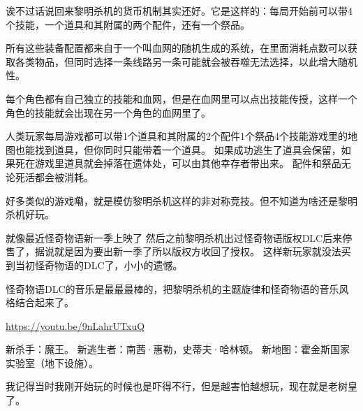 诶不过话说回来黎明杀机的货币机制其实还好。它是这样的：每局开始前可以带4个技能，一个道具和其附属的两个配件，还有一个祭品。

所有这些装备配置都来自于一个叫血网的随机生成的系统，在里面消耗点数可以获取各类物品，但同时选择一条线路另一条可能就会被吞噬无法选择，以此增大随机性。

每个角色都有自己独立的技能和血网，但是在血网里可以点出技能传授，这样一个角色的技能就会出现在另一个角色的血网里了。

人类玩家每局游戏都可以带1个道具和其附属的2个配件1个祭品4个技能游戏里的地图也能找到道具，但你同时只能带着一个道具。
如果成功逃生了道具会保留，如果死在游戏里道具就会掉落在遗体处，可以由其他幸存者带出来。
配件和祭品无论死活都会被消耗。

好多类似的游戏嘞，就是模仿黎明杀机这样的非对称竞技。但不知道为啥还是黎明杀机好玩。

就像最近怪奇物语新一季上映了 然后之前黎明杀机出过怪奇物语版权DLC后来停售了，据说就是因为要出新一季了所以版权方收回了授权。
这样新玩家就没法买到当初怪奇物语的DLC了，小小的遗憾。

怪奇物语DLC的音乐是最最最棒的，把黎明杀机的主题旋律和怪奇物语的音乐风格结合起来了。

\href{https://youtu.be/9nLahrUTxuQ}{https://youtu.be/9nLahrUTxuQ}

新杀手：魔王。
新逃生者：南茜·惠勒，史蒂夫·哈林顿。
新地图：霍金斯国家实验室（地下设施）。

我记得当时我刚开始玩的时候也是吓得不行，但是越害怕越想玩，现在就是老树皇了。








